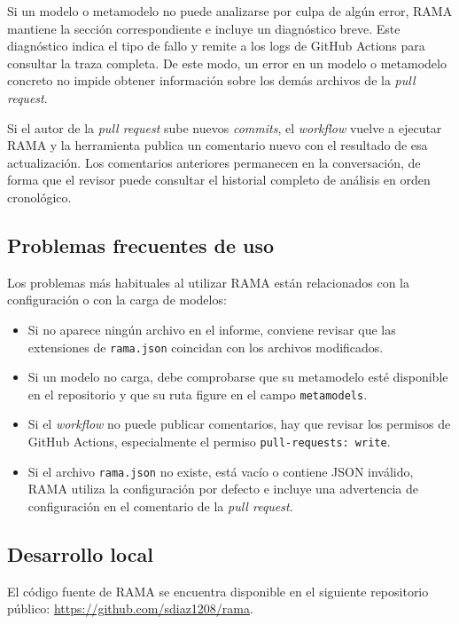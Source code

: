 \documentclass[11pt]{article}
\begin{document}
Si un modelo o metamodelo no puede analizarse por culpa de algún error, RAMA mantiene la sección correspondiente e incluye un diagnóstico breve. Este diagnóstico indica el tipo de fallo y remite a los logs de GitHub Actions para consultar la traza completa. De este modo, un error en un modelo o metamodelo concreto no impide obtener información sobre los demás archivos de la \textit{pull request}.

Si el autor de la \textit{pull request} sube nuevos \textit{commits}, el \textit{workflow} vuelve a ejecutar RAMA y la herramienta publica un comentario nuevo con el resultado de esa actualización. Los comentarios anteriores permanecen en la conversación, de forma que el revisor puede consultar el historial completo de análisis en orden cronológico.

\subsection{Problemas frecuentes de uso}

Los problemas más habituales al utilizar RAMA están relacionados con la configuración o con la carga de modelos:

\begin{itemize}
    \item Si no aparece ningún archivo en el informe, conviene revisar que las extensiones de \texttt{rama.json} coincidan con los archivos modificados.
    \item Si un modelo no carga, debe comprobarse que su metamodelo esté disponible en el repositorio y que su ruta figure en el campo \texttt{metamodels}.
    \item Si el \textit{workflow} no puede publicar comentarios, hay que revisar los permisos de GitHub Actions, especialmente el permiso \texttt{pull-requests: write}.
    \item Si el archivo \texttt{rama.json} no existe, está vacío o contiene JSON inválido, RAMA utiliza la configuración por defecto e incluye una advertencia de configuración en el comentario de la \textit{pull request}.
\end{itemize}

\subsection{Desarrollo local}

El código fuente de RAMA se encuentra disponible en el siguiente repositorio público: \url{https://github.com/sdiaz1208/rama}.
\end{document}
